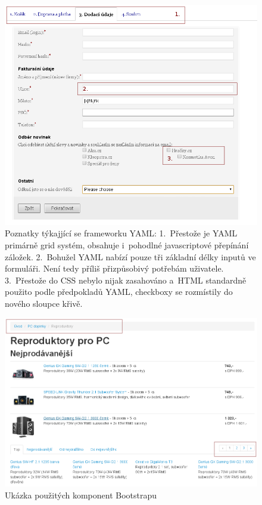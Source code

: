 \documentclass[thesis=B,czech]{FITthesis}[2012/06/26]
\begin{document}
\begin{figure}[h]
	\begin{center}
	\includegraphics[scale=0.7]{images/image19.png}
	\end{center}
	\caption[Poznatky týkající se frameworku YAML]{Poznatky týkajjící se frameworku YAML: 1.~Přestože je YAML primárně grid  systém, obsahuje i~pohodlné javascriptové přepínání záložek. 2.~Bohužel YAML nabízí pouze tři základní délky inputů ve formuláři. Není tedy příliš přizpůsobivý potřebám uživatele. 3.~Přestože do \gls{CSS} nebylo nijak zasahováno a~\gls{HTML} standardně použito podle předpokladů YAML, checkboxy se rozmístily do nového sloupce křivě.}
	\label{imgCom}
\end{figure}

\begin{figure}[h]
	\begin{center}
	\includegraphics[scale=0.5]{images/image08.png}
	\end{center}
	\caption{Ukázka použitých komponent Bootstrapu}
	\label{imgB1}
\end{figure}
\end{document}
